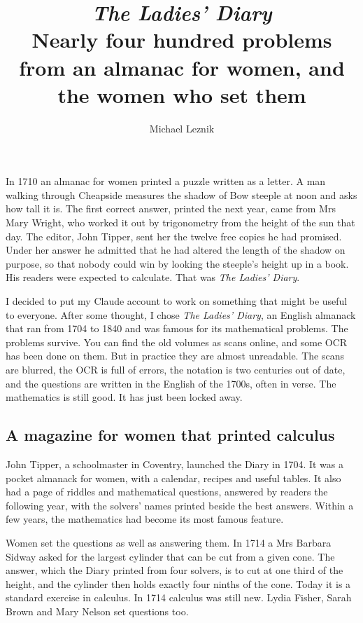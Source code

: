 \documentclass[11pt,a4paper]{article}
\title{\textit{The Ladies' Diary}\\[4pt]\large Nearly four hundred problems from an almanac for women, and the women who set them}
\author{Michael Leznik}\date{}
\begin{document}
\maketitle
In 1710 an almanac for women printed a puzzle written as a letter. A man
walking through Cheapside measures the shadow of Bow steeple at noon and
asks how tall it is. The first correct answer, printed the next year,
came from Mrs Mary Wright, who worked it out by trigonometry from the
height of the sun that day. The editor, John Tipper, sent her the twelve
free copies he had promised. Under her answer he admitted that he had
altered the length of the shadow on purpose, so that nobody could win by
looking the steeple's height up in a book. His readers were expected to
calculate. That was \emph{The Ladies' Diary}.

I decided to put my Claude account to work on something that might be
useful to everyone. After some thought, I chose \emph{The Ladies'
Diary}, an English almanack that ran from 1704 to 1840 and was famous
for its mathematical problems. The problems survive. You can find the
old volumes as scans online, and some OCR has been done on them. But in
practice they are almost unreadable. The scans are blurred, the OCR is
full of errors, the notation is two centuries out of date, and the
questions are written in the English of the 1700s, often in verse. The
mathematics is still good. It has just been locked away.

\hypertarget{a-magazine-for-women-that-printed-calculus}{%
\subsection{A magazine for women that printed
calculus}\label{a-magazine-for-women-that-printed-calculus}}

John Tipper, a schoolmaster in Coventry, launched the Diary in 1704. It
was a pocket almanack for women, with a calendar, recipes and useful
tables. It also had a page of riddles and mathematical questions,
answered by readers the following year, with the solvers' names printed
beside the best answers. Within a few years, the mathematics had become
its most famous feature.

Women set the questions as well as answering them. In 1714 a Mrs Barbara
Sidway asked for the largest cylinder that can be cut from a given cone.
The answer, which the Diary printed from four solvers, is to cut at one
third of the height, and the cylinder then holds exactly four ninths of
the cone. Today it is a standard exercise in calculus. In 1714 calculus
was still new. Lydia Fisher, Sarah Brown and Mary Nelson set questions
too.
\end{document}
